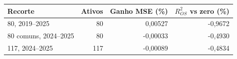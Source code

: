 \begin{tabular}{lrrr}
\toprule
Recorte & Ativos & Ganho MSE (\%) & $R^2_{OS}$ vs zero (\%)\\
\midrule
80, 2019--2025 & 80 & 0,00527 & -0,9672\\
80 comuns, 2024--2025 & 80 & -0,00033 & -0,4930\\
117, 2024--2025 & 117 & -0,00089 & -0,4834\\
\bottomrule
\end{tabular}
